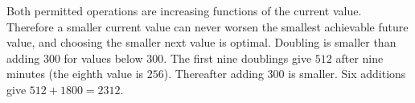 Both permitted operations are increasing functions of the current value. Therefore a smaller current value can never worsen the smallest achievable future value, and choosing the smaller next value is optimal. Doubling is smaller than adding $300$ for values below $300$. The first nine doublings give $512$ after nine minutes (the eighth value is $256$). Thereafter adding $300$ is smaller. Six additions give $512+1800=\boxed{2312}$.
